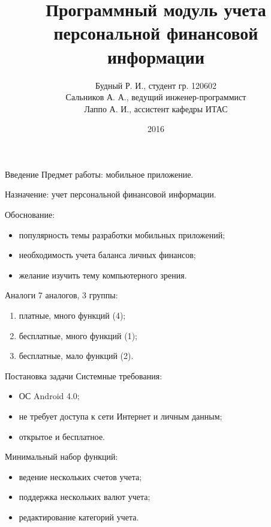 \documentclass[hyperref={pdftex,unicode}]{beamer}
\title{Программный модуль учета персональной финансовой информации}
\author{%
  Будный Р. И., студент гр. 120602 \\
  Сальников А. А., ведущий инженер-программист \\
  Лаппо А. И., ассистент кафедры ИТАС
}
\date{2016}
\begin{document}
\begin{frame}
  \maketitle
\end{frame}

\begin{frame}{Введение}
  Предмет работы: мобильное приложение.

  \smallskip
  Назначение: учет персональной финансовой информации.

  \smallskip
  Обоснование:
  \begin{itemize}
  \item популярность темы разработки мобильных приложений;
  \item необходимость учета баланса личных финансов;
  \item желание изучить тему компьютерного зрения.
  \end{itemize}
\end{frame}

\begin{frame}{Аналоги}
  7 аналогов, 3 группы:
  \begin{enumerate}
    \item платные, много функций (4);
    \item бесплатные, много функций (1);
    \item бесплатные, мало функций (2).
  \end{enumerate}
\end{frame}

\begin{frame}{Постановка задачи}
  Системные требования:
  \begin{itemize}
    \item ОС Android 4.0;
    \item не требует доступа к сети Интернет и личным данным;
    \item открытое и бесплатное.
  \end{itemize}

  \smallskip
  Минимальный набор функций:
  \begin{itemize}
  \item ведение нескольких счетов учета;
  \item поддержка нескольких валют учета;
  \item редактирование категорий учета.
  \end{itemize}
\end{frame}
\end{document}
